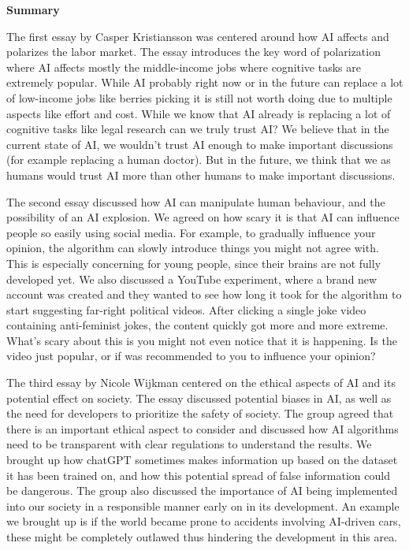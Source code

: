\documentclass[12pt]{article}
\begin{document}
\newpage
\begin{center}
    \huge
    \textbf{Summary}
\end{center}
\setlength\parindent{0pt}   %
\setlength{\parskip}{\bigskipamount}    %
{

The first essay by Casper Kristiansson was centered around how AI affects and polarizes the labor market. The essay introduces the key word of polarization where AI affects mostly the middle-income jobs where cognitive tasks are extremely popular. While AI probably right now or in the future can replace a lot of low-income jobs like berries picking it is still not worth doing due to multiple aspects like effort and cost. While we know that AI already is replacing a lot of cognitive tasks like legal research can we truly trust AI? We believe that in the current state of AI, we wouldn’t trust AI enough to make important discussions (for example replacing a human doctor). But in the future, we think that we as humans would trust AI more than other humans to make important discussions.

The second essay discussed how AI can manipulate human behaviour, and the possibility of an AI explosion. We agreed on how scary it is that AI can influence people so easily using social media. For example, to gradually influence your opinion, the algorithm can slowly introduce things you might not agree with. This is especially concerning for young people, since their brains are not fully developed yet. We also discussed a YouTube experiment, where a brand new account was created and they wanted to see how long it took for the algorithm to start suggesting far-right political videos. After clicking a single joke video containing anti-feminist jokes, the content quickly got more and more extreme. What's scary about this is you might not even notice that it is happening. Is the video just popular, or if was recommended to you to influence your opinion?



The third essay by Nicole Wijkman centered on the ethical aspects of AI and its potential effect on society. The essay discussed potential biases in AI, as well as the need for developers to prioritize the safety of society. The group agreed that there is an important ethical aspect to consider and discussed how AI algorithms need to be transparent with clear regulations to understand the results. We brought up how chatGPT sometimes makes information up based on the dataset it has been trained on, and how this potential spread of false information could be dangerous. The group also discussed the importance of AI being implemented into our society in a responsible manner early on in its development. An example we brought up is if the world became prone to accidents involving AI-driven cars, these might be completely outlawed thus hindering the development in this area. 

}
\end{document}
